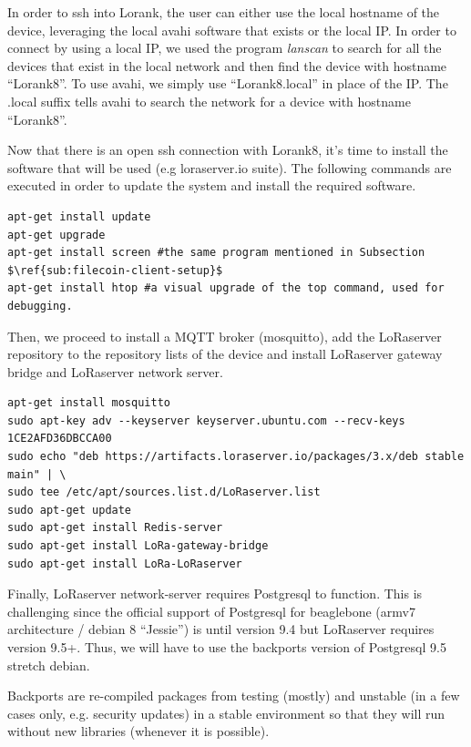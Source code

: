 In order to ssh into Lorank, the user can either use the local hostname of the device, leveraging the local avahi software that exists or the local IP. In order to connect by using a local IP, we used the program \textit{lanscan} to search for all the devices that exist in the local network and then find the device with hostname “Lorank8”. To use avahi, we simply use “Lorank8.local” in place of the IP. The .local suffix tells avahi to search the network for a device with hostname “Lorank8”.

Now that there is an open ssh connection with Lorank8, it’s time to install the software that will be used (e.g loraserver.io suite). The following commands are executed in order to update the system and install the required software.

\begin{verbatim}
apt-get install update 
apt-get upgrade
apt-get install screen #the same program mentioned in Subsection $\ref{sub:filecoin-client-setup}$
apt-get install htop #a visual upgrade of the top command, used for debugging.
\end{verbatim}
Then, we proceed to install a MQTT broker (mosquitto), add the LoRaserver repository to the repository lists of the device and install LoRaserver gateway bridge and LoRaserver network server.

\begin{verbatim}
apt-get install mosquitto
sudo apt-key adv --keyserver keyserver.ubuntu.com --recv-keys 1CE2AFD36DBCCA00
sudo echo "deb https://artifacts.loraserver.io/packages/3.x/deb stable main" | \
sudo tee /etc/apt/sources.list.d/LoRaserver.list
sudo apt-get update
sudo apt-get install Redis-server
sudo apt-get install LoRa-gateway-bridge
sudo apt-get install LoRa-LoRaserver

\end{verbatim}

Finally, LoRaserver network-server requires Postgresql\cite{postgresql} to function. This is challenging since the official support of Postgresql for beaglebone (armv7 architecture / debian 8 “Jessie”) is until version 9.4 but LoRaserver requires version 9.5+. Thus, we will have to use the backports version of Postgresql 9.5 stretch debian.

Backports are re-compiled packages from testing (mostly) and unstable (in a few cases only, e.g. security updates) in a stable environment so that they will run without new libraries (whenever it is possible).


